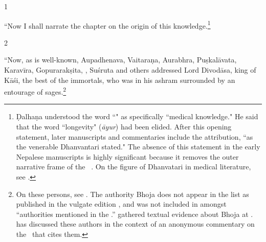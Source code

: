\begin{translation}
    
    \item[1] 
    
“Now I shall narrate the chapter on the origin of this
knowledge.\footnote{Ḍalhaṇa understood the word
    “" as specifically  “medical knowledge." He
    said that the word  “longevity" (\emph{āyur})  had been elided. %
    After this opening statement, later manuscripts and commentaries
    include the attribution,  “as the venerable Dhanvantari stated." 
    The absence of this statement in the early Nepalese manuscripts
    is highly significant because it removes the outer narrative
    frame of the \SS\
    \parencites[148]{wuja-2013}[\S\,3.1.2]{kleb-2021b}{rai-2019}{birc-2021}.  
    On the figure of Dhanvatari in medical literature, see \cite[IA 
    358--361]{meul-hist}.} %
    
    \item[2] 
    
“Now, as is well-known, Aupadhenava, Vaitaraṇa, Aurabhra,
Puṣkalāvata, Karavīra, Gopurarakṣita, , Suśruta and
others addressed Lord Divodāsa, king of Kāśi, the best of the
immortals, who was in his ashram surrounded by an entourage of
sages.\footnote{On these persons, see \cite[IA 361--363,
    369\,ff.]{meul-hist}. The authority Bhoja does not appear in the list
    as published in the vulgate edition \citep[1]{susr-trikamji2}, and
    was not included in \cite{meul-hist} amongst “authorities mentioned
    in the \SS.” \citeauthor{meul-hist} gathered textual evidence about
    Bhoja at \cite[IA 690--691]{meul-hist}. \citet{kleb-2021a} has
    discussed these authors in the context of an anonymous commentary on
    the \SS\ that cites them.}
    
    \nocite{emen-1969}
    
    

\end{translation}
